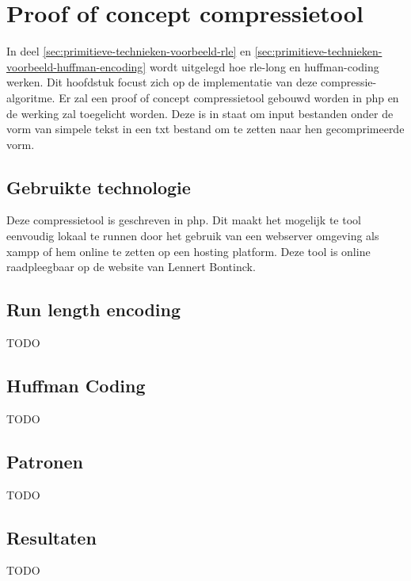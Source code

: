 \chapter{Proof of concept compressietool}
\label{ch:compressietool}

In deel \ref{sec:primitieve-technieken-voorbeeld-rle} en \ref{sec:primitieve-technieken-voorbeeld-huffman-encoding} wordt uitgelegd hoe \gls{rle-long} en \gls{huffman-coding} werken. Dit hoofdstuk focust zich op de implementatie van deze \gls{compressie-algoritme}. Er zal een proof of concept \gls{compressietool} gebouwd worden in \gls{php} en de werking zal toegelicht worden. Deze is in staat om input bestanden onder de vorm van simpele tekst in een txt bestand om te zetten naar hen gecomprimeerde vorm.
 
\section{Gebruikte technologie}
\label{sec:compressietool-gebruikte-technologie}

Deze \gls{compressietool} is geschreven in \gls{php}. Dit maakt het mogelijk te tool eenvoudig lokaal te runnen door het gebruik van een webserver omgeving als \gls{xampp} of hem online te zetten op een \gls{hosting} platform. Deze tool is online raadpleegbaar op de website van Lennert Bontinck.

\section{Run length encoding}
\label{sec:compressietool-rle}

TODO

\section{Huffman Coding}
\label{sec:compressietool-huffman}

TODO

\section{Patronen}
\label{sec:compressietool-patronen}

TODO

\section{Resultaten}
\label{sec:compressietool-resultaten}

TODO
